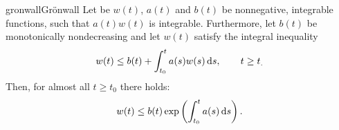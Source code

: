 \begin{Lemma*}{gronwall}{Grönwall}
  Let be $w(t)$, $a(t)$ and $b(t)$ be nonnegative, integrable
  functions, such that $a(t)w(t)$ is integrable. Furthermore, let
  $b(t)$ be monotonically nondecreasing and let $w(t)$ satisfy the
  integral inequality
  \begin{gather}
    \label{eq:awa:10}
    w(t) \le b(t) + \int_{t_0}^t a(s)w(s)\,\mathrm{d} s,\qquad t\ge t_.
  \end{gather}
  Then, for almost all $t \ge t_0$ there holds:
  \begin{gather}
    \label{eq:awa:11}
    w(t) \le b(t) \exp\left( \int_{t_0}^t  a(s) \,\mathrm{d} s\right).
  \end{gather}
\end{Lemma*}

